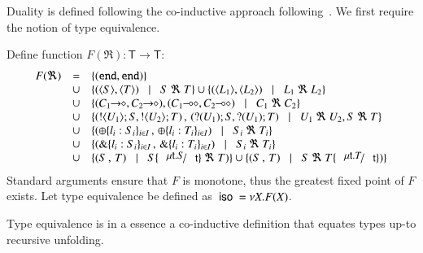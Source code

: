 Duality is defined following the co-inductive
approach following~\cite{GH05,TGC14}.
We first require the notion of type equivalence.
%
\begin{definition}\rm
\label{def:type_equiv}
	Define function $F(\Re): \mathsf{T} \longrightarrow \mathsf{T}$:
	\[
		\begin{array}{rcl}
			F(\Re) 	&=&	\set{(\tinact, \tinact)} \\
				&\cup&	\set{(\chtype{S}, \chtype{T}) \bnfbar S\ \Re\ T} \cup \set{(\chtype{L_1}, \chtype{L_2}) \bnfbar L_1\ \Re\ L_2}\\
				&\cup&	\set{(\shot{C_1}, \shot{C_2}), (\lhot{C_1}, \lhot{C_2}) \bnfbar C_1\ \Re\ C_2}\\
				&\cup&	\set{(\btout{U_1} S, \btout{U_2} T)\,,\, (\btinp{U_1} S, \btinp{U_1} T) \bnfbar U_1\ \Re\ U_2, S\ \Re\ T}\\
				&\cup&	\set{(\btsel{l_i: S_i}_{i \in I} \,,\, \btsel{l_i: T_i}_{i \in I}) \bnfbar  S_i\ \Re\ T_i}\\
				&\cup&	\set{(\btbra{l_i: S_i}_{i \in I}\,,\, \btbra{l_i: T_i}_{i \in I}) \bnfbar S_i\ \Re\ T_i}\\
				&\cup&	\set{(S\,,\, T) \bnfbar S\subst{\trec{t}{S}}{\vart{t}}\ \Re\ T)}
				\cup	\set{(S\,,\, T) \bnfbar S\ \Re\ T\subst{\trec{t}{T}}{\vart{t}})}
		\end{array}
	\]	
	\noi Standard arguments ensure that $F$ is monotone, thus the greatest fixed point
	of $F$ exists. Let type equivalence be defined as $\ \mathsf{iso}\  = \nu X. F(X)$.
\end{definition}
%
\noi Type equivalence is in a essence a co-inductive definition that
equates types up-to recursive unfolding.

